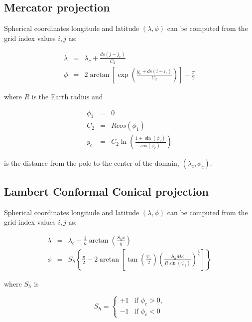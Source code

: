 \subsection{Mercator projection}

Spherical coordinates longitude and latitude $(\lambda, \phi)$ can be computed
from the grid index values $i,j$ as:

\begin{eqnarray}
  \lambda &=& \lambda_c + \frac{ds \left(j-j_c\right)}{C_2} \\
  \phi &=& 2 \arctan\left[\exp\left(\frac{y_c + 
         ds\left(i-i_c\right)}{C_2}\right)\right]-\frac{\pi}{2}
\end{eqnarray}

where $R$ is the Earth radius and

\begin{eqnarray}
  \phi_1 &=& 0 \\
  C_2 &=& R cos(\phi_1) \\
  y_c &=& C_2 \ln \left(\frac{1+\sin(\phi_c)}{cos(\phi_c)}\right)
\end{eqnarray}

is the distance from the pole to the center of the domain, $(\lambda_c,\phi_c)$.

\subsection{Lambert Conformal Conical projection}

Spherical coordinates longitude and latitude $(\lambda, \phi)$ can be computed
from the grid index values $i,j$ as:

\begin{eqnarray}
  \lambda &=& \lambda_c +
         \frac{1}{\kappa}\arctan\left(\frac{S_h x}{y}\right) \\
   \phi &=& S_h \left\{ \frac{\pi}{2} - 
          2 \arctan\left[ \tan\left(\frac{\psi_1}{2}\right) \left(
         \frac{S_h M \kappa}{R \sin(\psi_1)}\right)^{\frac{1}{\kappa}}\right]
         \right\}
\end{eqnarray}

where $S_h$ is

\begin{equation}
  S_h = 
  \begin{cases}
    +1 & \text{if $\phi_c > 0$,} \\
    -1 & \text{if $\phi_c < 0$}
  \end{cases}
\end{equation}

